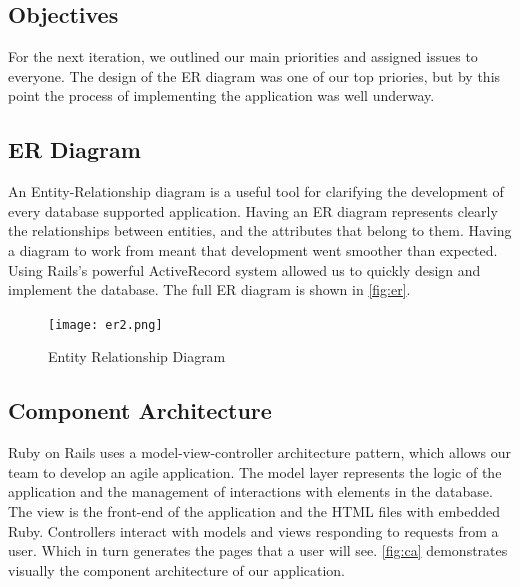 \documentclass{l3proj}
\begin{document}
\subsection{Objectives}
\label{sec:design-objectives}

For the next iteration, we outlined our main priorities and assigned issues to everyone. The design of the ER diagram was one of our top priories, but by this point the process of implementing the application was well underway.

\subsection{ER Diagram}
\label{sec:er}

An Entity-Relationship diagram \cite{er} is a useful tool for clarifying the development of every database supported application. Having an ER diagram represents clearly the relationships between entities, and the attributes that belong to them. Having a diagram to work from meant that development went smoother than expected. Using Rails's powerful ActiveRecord system allowed us to quickly design and implement the database. The full ER diagram is shown in \autoref{fig:er}.

\begin{figure}
\centerline{\texttt{[image: er2.png]}}
\caption{Entity Relationship Diagram}
\label{fig:er}
\end{figure}

\subsection{Component Architecture}
\label{sec:component}

Ruby on Rails uses a model-view-controller architecture pattern, which allows our team to develop an agile application. The model layer represents the logic of the application and the management of interactions with elements in the database. The view is the front-end of the application and the HTML files with embedded Ruby. Controllers interact with models and views responding to requests from a user. Which in turn generates the pages that a user will see.
\autoref{fig:ca} demonstrates visually the component architecture of our application.
\end{document}
